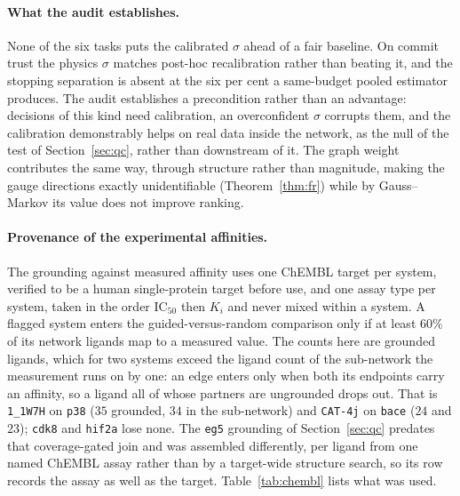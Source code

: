 \paragraph{What the audit establishes.} None of the six tasks puts the calibrated $\sigma$ ahead of
a fair baseline. On commit trust the physics $\sigma$ matches post-hoc recalibration rather than
beating it, and the stopping separation is absent at the six per cent a same-budget pooled
estimator produces. The audit establishes a precondition rather than an advantage: decisions of
this kind need calibration, an overconfident $\sigma$ corrupts them, and the calibration
demonstrably helps on real data inside the network, as the null of the test of
Section~\ref{sec:qc}, rather than downstream of it. The graph weight contributes the same
way, through structure rather than magnitude, making the gauge directions exactly unidentifiable
(Theorem~\ref{thm:fr}) while by Gauss--Markov its value does not improve ranking.

\paragraph{Provenance of the experimental affinities.} The grounding against measured affinity
uses one ChEMBL target per system, verified to be a human single-protein target before use, and
one assay type per system, taken in the order $\mathrm{IC}_{50}$ then $K_i$ and never mixed within
a system. A flagged system enters the guided-versus-random comparison only if at least $60\%$ of
its network ligands map to a measured value. The counts here are grounded ligands, which for two
systems exceed the ligand count of the sub-network the measurement runs on by one: an edge enters
only when both its endpoints carry an affinity, so a ligand all of whose partners are ungrounded
drops out. That is \texttt{1\_1W7H} on \texttt{p38} ($35$ grounded, $34$ in the sub-network) and
\texttt{CAT-4j} on \texttt{bace} ($24$ and $23$); \texttt{cdk8} and \texttt{hif2a} lose none. The \texttt{eg5} grounding of Section~\ref{sec:qc}
predates that coverage-gated join and was assembled differently, per ligand from one named ChEMBL
assay rather than by a target-wide structure search, so its row records the assay as well as the
target. Table~\ref{tab:chembl} lists what was used.

